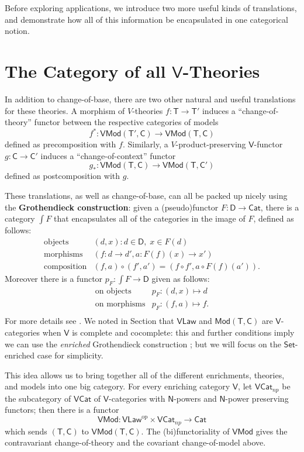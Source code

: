\documentclass{amsart}
\theoremstyle{definition}
\newcommand{\Set}{\mathsf{Set}}
\newcommand{\Cat}{\mathsf{Cat}}
\newcommand{\Law}{\mathsf{Law}}
\newcommand{\Mod}{\mathsf{Mod}}
\newcommand{\NN}{\mathsf{N}}
\newcommand{\V}{\mathsf{V}}
\newcommand{\D}{\mathsf{D}}
\newcommand{\C}{\mathsf{C}}
\newcommand{\T}{\mathsf{T}}
\newcommand{\op}{\mathrm{op}}
\newcommand{\maps}{\colon}
\begin{document}
Before exploring applications, we introduce two more useful kinds of translations, and demonstrate how all of this information be encapsulated in one categorical notion.

\section{The Category of all $\V$-Theories}

In addition to change-of-base, there are two other natural and useful translations for these theories.  A morphism of $V$-theories $f\maps\T\to \T'$ induces a ``change-of-theory'' functor between the respective categories of models \[  f^*\maps\V\Mod(\T',\C)\to \V\Mod(\T,\C) \]
defined as precomposition with $f$.  Similarly, a $V$-product-preserving $\V$-functor $g\maps \C \to \C'$ induces a ``change-of-context'' functor 
\[  g_*\maps \V\Mod(\T,\C) \to \V\Mod(\T,\C') \]
defined as postcomposition with $g$.   

These translations, as well as change-of-base, can all be packed up nicely using the \textbf{Grothendieck construction}: given a (pseudo)functor $F\maps \D \to \Cat$, there is a category $\int F$ that encapsulates all of the categories in the image of $F$, defined
as follows:
\[\begin{array}{rl}
\text{objects} & (d,x) \colon d\in \D, \; x\in F(d)\\
\text{morphisms} & (f\maps d\to d',a\maps F(f)(x)\to x')\\
\text{composition} & (f,a) \circ (f',a') = (f \circ f', a \circ F(f)(a')).
\end{array}\]
Moreover there is a functor $p_F \maps \int F \to \D$ given as follows:
\[\begin{array}{rl}
\text{on objects} & p_F \maps (d,x) \mapsto d \\
\text{on morphisms} & p_F \maps (f,a) \mapsto f .\\
\end{array}\]
For more details see \cite{borceux,jacobs}.  We noted in Section that $\V\Law$ and $\Mod(\T,\C)$ are $\V$-categories when $\V$ is complete and cocomplete: this and further conditions imply we can use the \textit{enriched} Grothendieck construction \cite{beardsleywong}; but we will focus on the $\Set$-enriched case for simplicity. 

This idea allows us to bring together all of the different enrichments, theories, and models into one big category. For every enriching category $\V$, let $\V\Cat_{np}$ be the subcategory of $\V\Cat$ of $\V$-categories with $\NN$-powers and $\NN$-power preserving functors; then there is a functor $$\V\Mod\maps \V\Law^\op \times \V\Cat_{np} \to \Cat$$ which sends $(\T,\C)$ to $\V\Mod(\T,\C)$. The (bi)functoriality of $\V\Mod$ gives the contravariant change-of-theory and the covariant change-of-model above.
\end{document}
